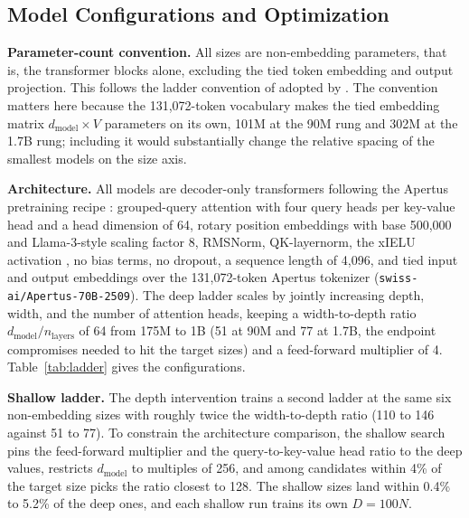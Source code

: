 \subsection{Model Configurations and Optimization}
\label{app:model-configurations}

\textbf{Parameter-count convention.} All sizes are non-embedding parameters, that is, the transformer blocks alone, excluding the tied token embedding and output projection. This follows the ladder convention of \citep{bhagia_establishing_2025} adopted by \citet{heineman_signal_2025}. The convention matters here because the 131,072-token vocabulary makes the tied embedding matrix $d_{\mathrm{model}} \times V$ parameters on its own, 101M at the 90M rung and 302M at the 1.7B rung; including it would substantially change the relative spacing of the smallest models on the size axis.

\textbf{Architecture.} All models are decoder-only transformers following the Apertus pretraining recipe \citep{apertus_apertus_2025}: grouped-query attention \citep{ainslie_gqa_2023} with four query heads per key-value head and a head dimension of 64, rotary position embeddings \citep{su_roformer_2023} with base 500,000 and Llama-3-style scaling factor 8, RMSNorm, QK-layernorm, the xIELU activation \citep{huang_xielu_2025}, no bias terms, no dropout, a sequence length of 4,096, and tied input and output embeddings over the 131,072-token Apertus tokenizer (\texttt{swiss-ai/Apertus-70B-2509}). The deep ladder scales by jointly increasing depth, width, and the number of attention heads, keeping a width-to-depth ratio $d_{\mathrm{model}}/n_{\mathrm{layers}}$ of 64 from 175M to 1B (51 at 90M and 77 at 1.7B, the endpoint compromises needed to hit the target sizes) and a feed-forward multiplier of 4. Table~\ref{tab:ladder} gives the configurations.

\textbf{Shallow ladder.} The depth intervention trains a second ladder at the same six non-embedding sizes with roughly twice the width-to-depth ratio (110 to 146 against 51 to 77). To constrain the architecture comparison, the shallow search pins the feed-forward multiplier and the query-to-key-value head ratio to the deep values, restricts $d_{\mathrm{model}}$ to multiples of 256, and among candidates within 4\% of the target size picks the ratio closest to 128. The shallow sizes land within 0.4\% to 5.2\% of the deep ones, and each shallow run trains its own $D = 100N$.


